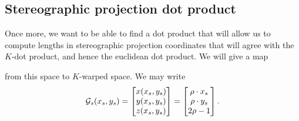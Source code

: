 \documentclass[hints,handout,12pt,noauthor,nooutcomes]{ximera}
\begin{document}
\subsection{Stereographic projection dot product}

Once more, we want to be able to find a dot product that will allow us
to compute lengths in stereographic projection coordinates that will agree
with the $K$-dot product, and hence the euclidean dot product. We will give a map

\begin{center}
\end{center}
from this space to $K$-warped space. We may write
\[
\mathcal{G}_s(x_s,y_s) = 
\begin{bmatrix}
x(x_s,y_s)  \\
y(x_s,y_s)  \\
z(x_s,y_s)  
\end{bmatrix}
=
\begin{bmatrix}
\rho  \cdot x_s  \\
\rho \cdot y_s  \\
2\rho -1
\end{bmatrix}.
\]
\end{document}
